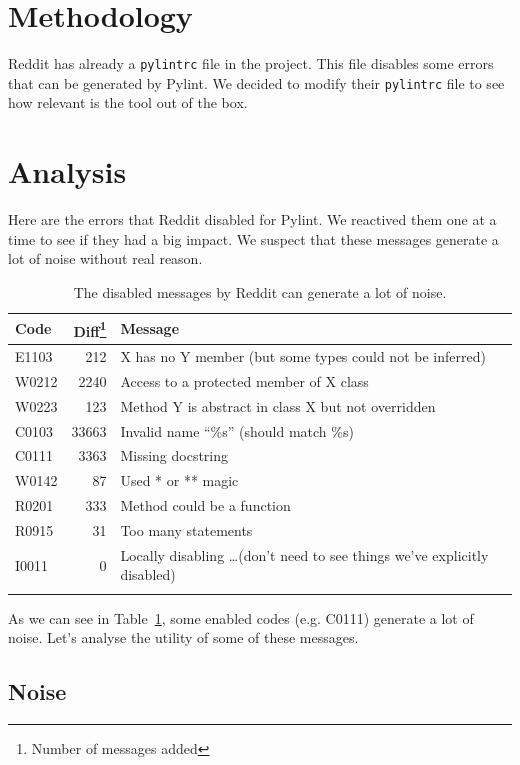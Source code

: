 \documentclass[11pt, a4paper]{article}
\newcommand{\pyl}{\textsf{Pylint}}
\begin{document}
\section{Methodology}

Reddit has already a \texttt{pylintrc} file in the project.
This file disables some errors that can be generated by \pyl{}.
We decided to modify their \texttt{pylintrc} file to see how relevant is the tool out of the box.
\medskip

\section{Analysis}
Here are the errors that Reddit disabled for \pyl{}. 
We reactived them one at a time to see if they had a big impact.
We suspect that these messages generate a lot of noise without real reason. \\

\begin{longtable}{|l|r|m{9cm}|}
\hline
\textbf{\small{Code}} & \textbf{\small{Diff\footnote{Number of messages added}}} & \textbf{\small{Message}} \\
\hline
\hline
E1103 & 212 & X has no Y member (but some types could not be inferred) \\
\hline
W0212 & 2240  & Access to a protected member of X class \\
\hline
W0223 & 123 & Method Y is abstract in class X but not overridden \\
\hline
C0103 & 33663 & Invalid name ``\%s'' (should match \%s) \\
\hline
C0111 & 3363 & Missing docstring \\
\hline
W0142 & 87 & Used * or ** magic \\
\hline
R0201 & 333 & Method could be a function \\
\hline
R0915 & 31 & Too many statements \\
\hline
I0011 & 0 & Locally disabling \dots (don't need to see things we've explicitly disabled) \\
\hline
\caption{\label{messages} The disabled messages by Reddit can generate a lot of noise. }
\end{longtable}



\newpage
As we can see in Table~\ref{messages}, some enabled codes (e.g. C0111) generate a lot of noise. 
Let's analyse the utility of some of these messages.

\subsection*{Noise}
\end{document}
